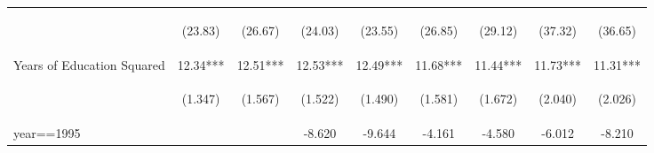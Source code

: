 \documentclass[10pt,letterpaper,subeqn, xcolor=table]{beamer}
\begin{document}
\begin{frame}[label=otherPANEL]
\begin{table}[htpb!]
\begin{center}
{\begin{tabular}{lcccccccc}
        & \begin{footnotesize}(23.83)\end{footnotesize} & \begin{footnotesize}(26.67)\end{footnotesize} & \begin{footnotesize}(24.03)\end{footnotesize} & \begin{footnotesize}(23.55)\end{footnotesize} & \begin{footnotesize}(26.85)\end{footnotesize} & \begin{footnotesize}(29.12)\end{footnotesize} & \begin{footnotesize}(37.32)\end{footnotesize} & \begin{footnotesize}(36.65)\end{footnotesize} \\

        Years of Education Squared&12.34***&12.51***&12.53***&12.49***&11.68***&11.44***&11.73***&11.31***\\

        & \begin{footnotesize}(1.347)\end{footnotesize} & \begin{footnotesize}(1.567)\end{footnotesize} & \begin{footnotesize}(1.522)\end{footnotesize} & \begin{footnotesize}(1.490)\end{footnotesize} & \begin{footnotesize}(1.581)\end{footnotesize} & \begin{footnotesize}(1.672)\end{footnotesize} & \begin{footnotesize}(2.040)\end{footnotesize} & \begin{footnotesize}(2.026)\end{footnotesize} \\

        year==1995&&&-8.620&-9.644&-4.161&-4.580&-6.012&-8.210\\


\end{tabular}}
\end{center}
\end{table}
\end{frame}
\end{document}
